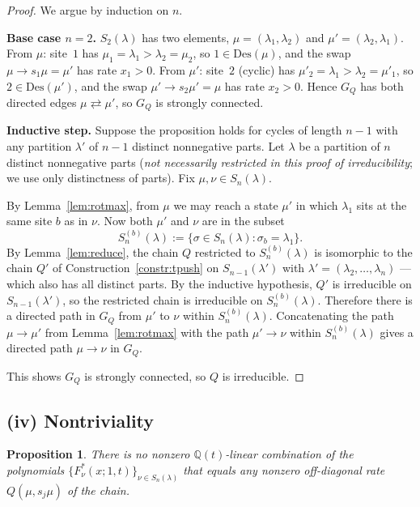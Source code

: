 \documentclass[12pt]{article}
\newtheorem{proposition}[theorem]{Proposition}
\theoremstyle{definition}
\begin{document}
\begin{proof}
We argue by induction on $n$.

\textbf{Base case $n=2$.} $S_2(\lambda)$ has two elements,
$\mu=(\lambda_1,\lambda_2)$ and $\mu'=(\lambda_2,\lambda_1)$. From $\mu$:
site~$1$ has $\mu_1=\lambda_1>\lambda_2=\mu_2$, so
$1\in\mathrm{Des}(\mu)$, and the swap $\mu\to s_1\mu=\mu'$ has rate
$x_1>0$. From $\mu'$: site~$2$ (cyclic) has $\mu'_2=\lambda_1>\lambda_2
=\mu'_1$, so $2\in\mathrm{Des}(\mu')$, and the swap $\mu'\to s_2\mu'
=\mu$ has rate $x_2>0$. Hence $G_Q$ has both directed edges $\mu
\rightleftarrows\mu'$, so $G_Q$ is strongly connected.

\textbf{Inductive step.} Suppose the proposition holds for cycles of
length $n-1$ with any partition $\lambda'$ of $n-1$ distinct
nonnegative parts. Let $\lambda$ be a partition of $n$ distinct
nonnegative parts (\emph{not necessarily restricted in this proof of
irreducibility}; we use only distinctness of parts). Fix
$\mu,\nu\in S_n(\lambda)$.

By Lemma~\ref{lem:rotmax}, from $\mu$ we may reach a state $\mu'$ in
which $\lambda_1$ sits at the same site $b$ as in $\nu$. Now both
$\mu'$ and $\nu$ are in the subset
\[
S_n^{(b)}(\lambda):=\{\sigma\in S_n(\lambda):\sigma_b=\lambda_1\}.
\]
By Lemma~\ref{lem:reduce}, the chain $Q$ restricted to $S_n^{(b)}(\lambda)$
is isomorphic to the chain $Q'$ of Construction~\ref{constr:tpush} on
$S_{n-1}(\lambda')$ with $\lambda'=(\lambda_2,\dots,\lambda_n)$ — which
also has all distinct parts. By the inductive hypothesis, $Q'$ is
irreducible on $S_{n-1}(\lambda')$, so the restricted chain is
irreducible on $S_n^{(b)}(\lambda)$. Therefore there is a directed path
in $G_Q$ from $\mu'$ to $\nu$ within $S_n^{(b)}(\lambda)$. Concatenating
the path $\mu\to\mu'$ from Lemma~\ref{lem:rotmax} with the path
$\mu'\to\nu$ within $S_n^{(b)}(\lambda)$ gives a directed path
$\mu\to\nu$ in $G_Q$.

This shows $G_Q$ is strongly connected, so $Q$ is irreducible.
\end{proof}

\subsection{(iv) Nontriviality}\label{sec:nontriv}

\begin{proposition}\label{prop:nontriv}
There is no nonzero $\mathbb{Q}(t)$-linear combination of the polynomials
$\{F^*_\nu(x;1,t)\}_{\nu\in S_n(\lambda)}$ that equals any nonzero
off-diagonal rate $Q(\mu,s_j\mu)$ of the chain.
\end{proposition}
\end{document}
